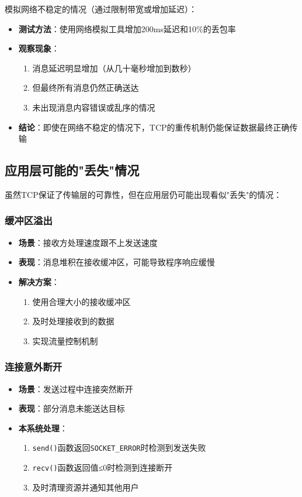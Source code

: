 \documentclass[12pt, a4paper]{article}
\newcommand{\cmd}[1]{\texttt{#1}}
\begin{document}
模拟网络不稳定的情况（通过限制带宽或增加延迟）：

\begin{itemize}[itemsep=3pt]
  \item \textbf{测试方法}：使用网络模拟工具增加200ms延迟和10\%的丢包率
  \item \textbf{观察现象}：
  \begin{enumerate}[itemsep=2pt]
    \item 消息延迟明显增加（从几十毫秒增加到数秒）
    \item 但最终所有消息仍然正确送达
    \item 未出现消息内容错误或乱序的情况
  \end{enumerate}
  \item \textbf{结论}：即使在网络不稳定的情况下，TCP的重传机制仍能保证数据最终正确传输
\end{itemize}

\subsection{应用层可能的"丢失"情况}

虽然TCP保证了传输层的可靠性，但在应用层仍可能出现看似"丢失"的情况：

\subsubsection{缓冲区溢出}

\begin{itemize}[itemsep=3pt]
  \item \textbf{场景}：接收方处理速度跟不上发送速度
  \item \textbf{表现}：消息堆积在接收缓冲区，可能导致程序响应缓慢
  \item \textbf{解决方案}：
  \begin{enumerate}[itemsep=2pt]
    \item 使用合理大小的接收缓冲区
    \item 及时处理接收到的数据
    \item 实现流量控制机制
  \end{enumerate}
\end{itemize}

\subsubsection{连接意外断开}

\begin{itemize}[itemsep=3pt]
  \item \textbf{场景}：发送过程中连接突然断开
  \item \textbf{表现}：部分消息未能送达目标
  \item \textbf{本系统处理}：
  \begin{enumerate}[itemsep=2pt]
    \item \cmd{send()}函数返回\cmd{SOCKET\_ERROR}时检测到发送失败
    \item \cmd{recv()}函数返回值≤0时检测到连接断开
    \item 及时清理资源并通知其他用户
  \end{enumerate}
\end{itemize}
\end{document}
